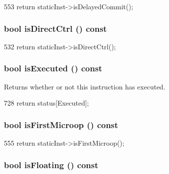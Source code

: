 \begin{DoxyCode}
553 { return staticInst->isDelayedCommit(); }
\end{DoxyCode}
\hypertarget{classBaseDynInst_ac218ba4230a8cd92999948288a54e14f}{
\subsubsection[{isDirectCtrl}]{\setlength{\rightskip}{0pt plus 5cm}bool isDirectCtrl () const}}
\label{classBaseDynInst_ac218ba4230a8cd92999948288a54e14f}



\begin{DoxyCode}
532 { return staticInst->isDirectCtrl(); }
\end{DoxyCode}
\hypertarget{classBaseDynInst_a25d5f6d24c54820fbd19eb0e4e59dcac}{
\subsubsection[{isExecuted}]{\setlength{\rightskip}{0pt plus 5cm}bool isExecuted () const}}
\label{classBaseDynInst_a25d5f6d24c54820fbd19eb0e4e59dcac}
Returns whether or not this instruction has executed. 


\begin{DoxyCode}
728 { return status[Executed]; }
\end{DoxyCode}
\hypertarget{classBaseDynInst_a937b23736e22f67d6b168c0c029deec4}{
\subsubsection[{isFirstMicroop}]{\setlength{\rightskip}{0pt plus 5cm}bool isFirstMicroop () const}}
\label{classBaseDynInst_a937b23736e22f67d6b168c0c029deec4}



\begin{DoxyCode}
555 { return staticInst->isFirstMicroop(); }
\end{DoxyCode}
\hypertarget{classBaseDynInst_a58024ee3f69c53c47ec5b315b78a7302}{
\subsubsection[{isFloating}]{\setlength{\rightskip}{0pt plus 5cm}bool isFloating () const}}
\label{classBaseDynInst_a58024ee3f69c53c47ec5b315b78a7302}



